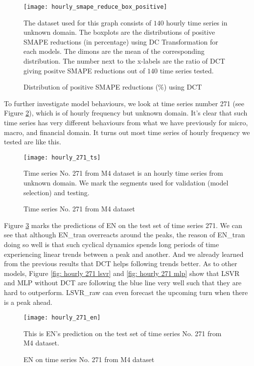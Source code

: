 \begin{figure}[H]
    \centering
    \texttt{[image: hourly\_smape\_reduce\_box\_positive]}
    \caption{Distribution of positive SMAPE reductions (\%) using DCT}
    {\raggedright \footnotesize The dataset used for this graph consists of $140$ hourly time series in unknown domain. The boxplots are the distributions of positive SMAPE reductions (in percentage) using DC Transformation for each models. The dimons are the mean of the corresponding distribution. The number next to the x-labels are the ratio of DCT giving positve SMAPE reductions out of $140$ time series tested.\par}
    \label{fig: hourly positive smape reduce box}
\end{figure}

To further investigate model behaviours, we look at time series number 271 (see Figure \ref{fig: hourly 271 ts}), which is of hourly frequency but unknown domain. It's clear that such time series has very different behaviours from what we have previously for micro, macro, and financial domain. It turns out most time series of hourly frequency we tested are like this.
\begin{figure}[H]
    \centering
    \texttt{[image: hourly\_271\_ts]}
    \caption{Time series No. 271 from M4 dataset}
    {\raggedright \footnotesize Time series No. 271 from M4 dataset is an hourly time series from unknown domain. We mark the segments used for validation (model selection) and testing.\par}
    \label{fig: hourly 271 ts}
\end{figure}
Figure \ref{fig: hourly 271 en} marks the predictions of EN on the test set of time series 271. We can see that although EN\_tran overreacts around the peaks, the reason of EN\_tran doing so well is that such cyclical dynamics spends long periods of time experiencing linear trends between a peak and another. And we already learned from the previous results that DCT helps following trends better. As to other models, Figure \ref{fig: hourly 271 lsvr} and \ref{fig: hourly 271 mlp} show that LSVR and MLP without DCT are following the blue line very well such that they are hard to outperform. LSVR\_raw can even forecast the upcoming turn when there is a peak ahead.
\begin{figure}[H]
    \centering
    \texttt{[image: hourly\_271\_en]}
    \caption{EN on time series No. 271 from M4 dataset}
    {\raggedright \footnotesize This is EN's prediction on the test set of time series No. 271 from M4 dataset.  \par}
    \label{fig: hourly 271 en}
\end{figure}
